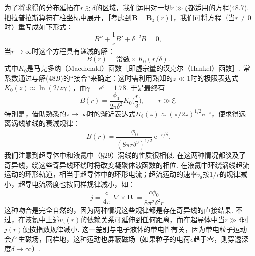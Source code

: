 为了将求得的分布延拓在$r\gtrsim\delta$的区域，我们运用对一切$r\gg\xi$都适用的方程(48.7). 把拉普拉斯算符在柱坐标中展开，［考虑到$\bm{B}=\bm{B}_z(r)$］，我们可将方程（当$r\neq0$时）重写成如下形式：
\begin{equation*}
B''+\frac{1}{r}B'+\delta^{-2}B=0,
\end{equation*}
当$r\to\infty$时这个方程具有递减的解：
\begin{equation*}
B(r)=\text{常数}\times K_0(r/\delta).
\end{equation*}
式中$K_0$是马克多纳（Macdonald）函数［即虚宗量的汉克尔（Hankel）函数］. 常系数通过与解(48.9)的“接合”来确定：这时需利用熟知的$z\ll1$时的极限表达式$K_0(z)\approx\ln(2/z\gamma)$，而$\gamma=\mathrm{e}^{\mathrm{c}}=1.78$. 于是最终有
\begin{equation}
B(r)=\frac{\phi_0}{2\pi\delta^2}K_0\biggl(\frac{r}{\delta}\biggr),\qquad r\gg\xi.
\end{equation}
特别是，借助熟悉的$z\to\infty$时的渐近表达式$K_0(z)\approx(\pi/2z)^{1/2}\mathrm{e}^{-z}$，便求得远离涡线轴线的衰减规律：
\begin{equation}
B(r)=\frac{\phi_0}{(8\pi r\delta^3)^{1/2}}\,\mathrm{e}^{-r/\delta}.
\end{equation}
我们注意到超导体中和液氦中（§29）涡线的性质很相似. 在这两种情况都谈及了奇异线，绕这些奇异线环绕时将改变凝聚体波函数的相位. 在液氦中环绕涡线超流运动的环形轨道，相当于超导体中的环形电流；超流运动的速率$v_{\mathrm{s}}$按$1/r$的规律减小，超导电流密度也按同样规律减小，如：
\begin{equation}
j=\frac{c}{4\pi}\,|\nabla\times\bm{B}|=\frac{c\phi_0}{8\pi^2\delta^2 r}.
\end{equation}
这种吻合是完全自然的，因为两种情况这些规律都是存在奇异线的直接结果. 不过，在液氦中上述$v_{\mathrm{s}}(r)$的依赖关系可延伸到任何距离，而在超导体中当$r\gg\delta$时$j(r)$便按指数规律减小. 这一差别与电子液体的带电性有关，因为带电粒子运动会产生磁场，同样地，这种运动也屏蔽磁场（如果粒子的电荷$e$趋于零，则穿透深度$\delta\to\infty$）.

